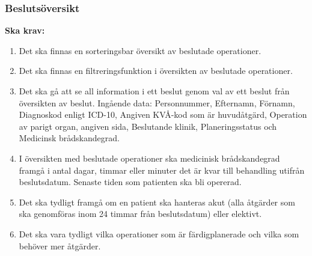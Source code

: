\documentclass{article}
\begin{document}
\begin{enumerate}
\subsubsection{Beslutsöversikt}
\textbf{Ska krav: }
\begin{enumerate}
  \item Det ska finnas en sorteringsbar översikt av beslutade operationer.
  \item Det ska finnas en filtreringsfunktion i översikten av beslutade
  operationer.
  \item Det ska gå att se all information i ett beslut genom val av ett
  beslut från översikten av beslut.
  Ingående data:
  Personnummer, Efternamn, Förnamn, Diagnoskod enligt ICD-10, Angiven KVÅ-kod
  som är huvudåtgärd, Operation av parigt organ, angiven sida, Beslutande
  klinik, Planeringsstatus och Medicinsk brådskandegrad.
  \item I översikten med beslutade operationer ska medicinisk brådskandegrad
  framgå i antal dagar, timmar eller minuter det är kvar till behandling utifrån
  beslutsdatum. Senaste tiden som patienten ska bli opererad.
  \item Det ska tydligt framgå om en patient ska hanteras akut (alla åtgärder
  som ska genomföras inom 24 timmar från beslutsdatum) eller elektivt.
  \item Det ska vara tydligt vilka operationer som är färdigplanerade och vilka
  som behöver mer åtgärder.
\end{enumerate}

\end{enumerate}
\end{document}
